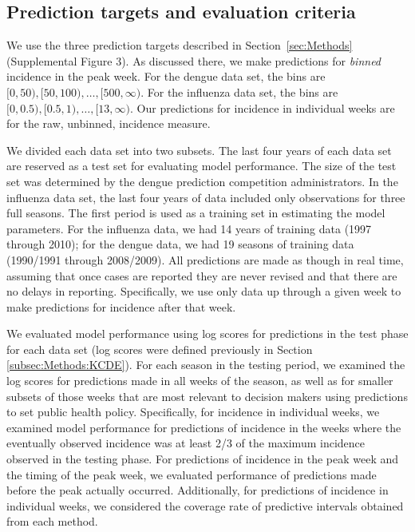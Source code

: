\documentclass[times, doublespace]{simauth}\usepackage[]{graphicx}\usepackage[]{color}
\begin{document}
\subsection{Prediction targets and evaluation criteria}

We use the three prediction targets described in Section~\ref{sec:Methods}
(Supplemental Figure 3).
As discussed there, we make predictions for \textit{binned} incidence in the peak
week.  For the dengue data set, the bins are $[0, 50), [50, 100), \ldots, [500, \infty)$.
For the influenza data set, the bins are $[0, 0.5), [0.5, 1), \ldots, [13, \infty)$.
Our predictions for incidence in individual weeks are for the raw, unbinned,
incidence measure.

We divided each data set into two subsets.  The last four years of each data set are
reserved as a test set for evaluating model performance.  The size of the test set was determined by
the dengue prediction competition administrators.  In the influenza data set, the last four years of data included
only observations for three full seasons.  The first period is used as a training set in
estimating the model parameters.  For the influenza data, we had 14 years of training data (1997 through 2010);
for the dengue data, we had 19 seasons of training data (1990/1991 through 2008/2009).
All predictions are made as though in real time, assuming that
once cases are reported they are never revised and that there are no delays in
reporting.  Specifically, we use only data up through a given week to
make predictions for incidence after that week.

We evaluated model performance using log scores for predictions in the test phase for each data set
(log scores were defined previously in Section \ref{subsec:Methods:KCDE}).
For each season in the testing period, we examined the log scores for
predictions made in all weeks of the season, as well as for smaller subsets of those weeks
that are most relevant to decision makers using predictions to set
public health policy.  Specifically, for incidence in individual weeks, we examined
model performance for predictions of incidence in the weeks where the eventually observed
incidence was at least 2/3 of the maximum incidence observed in the testing phase.
For predictions of incidence in the peak week and the timing of the peak week,
we evaluated performance of predictions made before the peak actually occurred.
Additionally, for predictions of incidence in individual weeks, we considered the
coverage rate of predictive intervals obtained from each method.
\end{document}
